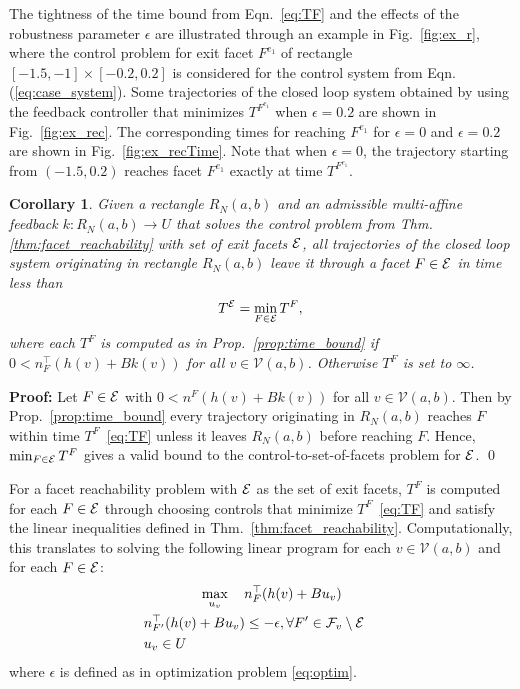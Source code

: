 \documentclass{ifacconf}
\newtheorem{corollary}{Corollary}
\newcommand{\VNset}{\mathcal{V}(a,b)}
\newcommand{\RNab}{R_N(a,b)}
\newcommand{\Fset}{{\cal E}}
\begin{document}
The tightness of the time bound from Eqn.~\eqref{eq:TF} and the effects of the robustness parameter $\epsilon$ are illustrated through an example in Fig.~\ref{fig:ex_r}, where the control problem for exit facet $F^{e_1}$ of rectangle $[-1.5, -1] \times [-0.2, 0.2]$ is considered for the control system from Eqn. (\ref{eq:case_system}). Some trajectories of the closed loop system obtained by using the feedback controller that minimizes $T^{F^{e_1}}$ when $\epsilon=0.2$ are shown in Fig.~\ref{fig:ex_rec}. 
The corresponding times for reaching $F^{e_1}$ for $\epsilon=0$ and $\epsilon=0.2$ are shown in Fig.~\ref{fig:ex_recTime}. 
Note that when $\epsilon=0$, the trajectory starting from $(-1.5, 0.2)$ reaches facet $F^{e_1}$ exactly at time $T^{F^{e_1}}$.


\begin{corollary}\label{prop:multi_facet_time_bound}
Given a rectangle $\RNab$ and  an admissible multi-affine feedback $k: \RNab
\longrightarrow U$ that solves the control problem from Thm. \ref{thm:facet_reachability} with set of exit facets $\Fset$, all trajectories of the closed loop system originating in rectangle $\RNab$ leave it through a facet $F \in \Fset$ in time less than 
\[
T^{\Fset} = \min_{F \in \Fset} T^F,
\]
 where each $T^F$ is computed as in Prop.~\ref{prop:time_bound} if $0 < n_F^\top (h(v) + Bk(v)) $ for all $v \in \VNset$. Otherwise $T^F$ is set to $\infty$.
\end{corollary}


{\bf Proof:} Let $F \in \Fset$ with $0 < n^F (h(v) + Bk(v)) $ for all $v \in \VNset$. Then by Prop.~\ref{prop:time_bound} every trajectory originating in $\RNab$ reaches $F$ within time $T^F$~\eqref{eq:TF} unless it leaves $\RNab$ before reaching $F$. Hence, $\min_{F \in {\cal E}} T^F$ gives a valid bound to the control-to-set-of-facets problem for $\Fset$.
\qed

For a facet reachability problem with $\Fset$ as the set of exit facets,  $T^F$ is computed for each $F \in \Fset$ through choosing controls that minimize $T^F$~\eqref{eq:TF} and satisfy the linear inequalities defined in Thm.~\ref{thm:facet_reachability}. Computationally, this translates to solving the following linear program for each $v \in \VNset$ and for each $F \in \Fset$: 
\begin{align}
	& \ \ \ \ \ \ \ \ \ \ \ \ \max_{u_v}\ \ \  n_F^\top(h(v) + Bu_v) & \nonumber \label{eq:optimM}\\
	&    n_{F'}^\top(h(v) + Bu_v) \leq -\epsilon ,  \forall  F' \in {\cal F}_v \setminus \Fset \nonumber \\
	& u_v \in U
\end{align}
where $\epsilon$ is defined as in optimization problem \eqref{eq:optim}.
\end{document}

